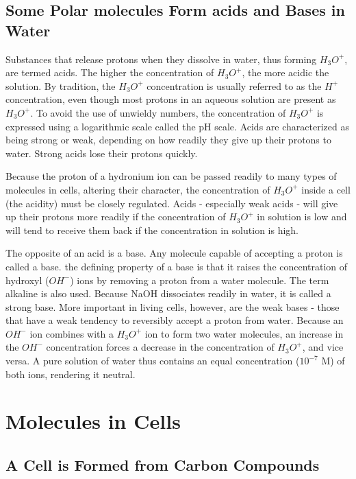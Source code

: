 \subsection{Some Polar molecules Form acids and Bases in Water}

Substances that release protons when they dissolve in water, thus forming 
$H_{3}O^{+}$, are termed acids. The higher the concentration of $H_{3}O^{+}$, the
more acidic the solution.
By tradition, the $H_{3}O^{+}$ concentration is usually referred to as the $H^{+}$ concentration, even though
most protons in an aqueous solution are present as $H_{3}O^{+}$. To avoid the
use of unwieldy numbers, the concentration of $H_{3}O^{+}$ is expressed using
a logarithmic scale called the pH scale.
Acids are characterized as being strong or weak, depending on how
readily they give up their protons to water. Strong acids lose their protons quickly.

Because the proton of a hydronium ion can be passed readily to many
types of molecules in cells, altering their character, the concentration of
$H_{3}O^{+}$ inside a cell (the acidity) must be closely regulated. Acids - especially
weak acids - will give up their protons more readily if the concentration
of $H_{3}O^{+}$ in solution is low and will tend to receive them back if the concentration 
in solution is high.

The opposite of an acid is a base. Any molecule capable of accepting a
proton is called a base.
the defining property of a base is that it raises the concentration 
of hydroxyl ($OH^{-}$) ions by removing a proton from a water molecule.
The term alkaline is also used.
Because NaOH dissociates readily in water, it is called a strong base.
More important in living cells, however, are the weak bases - those that
have a weak tendency to reversibly accept a proton from water.
Because an $OH^{-}$ ion combines with a $H_{3}O^{+}$ ion to form two water molecules, 
an increase in the $OH^{-}$ concentration forces a decrease in the
concentration of $H_{3}O^{+}$, and vice versa. A pure solution of water thus contains 
an equal concentration ($10^{-7}$ M) of both ions, rendering it neutral.

\section{Molecules in Cells}

\subsection{A Cell is Formed from Carbon Compounds}

